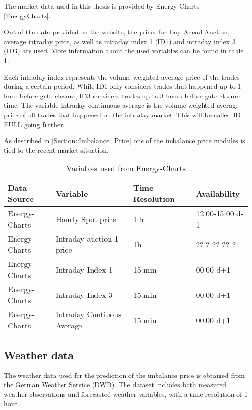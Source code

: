 \documentclass[class=scrbook, crop=false]{standalone}
\begin{document}
The market data used in this thesis is provided by Energy-Charts \ref{EnergyCharts}.


Out of the data provided on the website, the prices for Day Ahead Auction, average intraday price, as well as intraday index 1 (ID1) and intraday index 3 (ID3) are used. 
More information about the used variables can be found in table \ref{Table::Market_Data}.

Each intraday index represents the volume-weighted average price of the trades during a certain period. 
While ID1 only considers trades that happened up to 1 hour before gate closure, ID3 considers trades up to 3 hours before gate closure time.
The variable Intraday continuous average is the volume-weighted average price of all trades that happened on the intraday market. 
This will be called ID FULL going further.

As described in \ref{Section::Imbalance_Price} one of the imbalance price modules is tied to the recent market situation.	

    
\begin{table}[]
\centering
\begin{tabular}{l|l|l|l}
 Data Source & Variable &  Time Resolution & Availability  \\\hline
 Energy-Charts & Hourly Spot price& 1 h& 12:00-15:00 d-1 \\
 Energy-Charts & Intraday auction 1 price & 1h & ?? ? ?? ?? ?\\
 Energy-Charts & Intraday Index 1 & 15 min &  00:00 d+1\\
 Energy-Charts & Intraday Index 3 & 15 min &  00:00 d+1\\
 Energy-Charts & Intraday Contiuous Average & 15 min &  00:00 d+1\\
   
\end{tabular}
\caption{Variables used from Energy-Charts}
\label{Table::Market_Data}
\end{table}

\subsection{Weather data}
\label{Section::Weather_Data}

The weather data used for the prediction of the imbalance price is obtained from the German Weather Service (DWD).
The dataset includes both measured weather observations and forecasted weather variables, with a time resolution of 1 hour.
\end{document}

